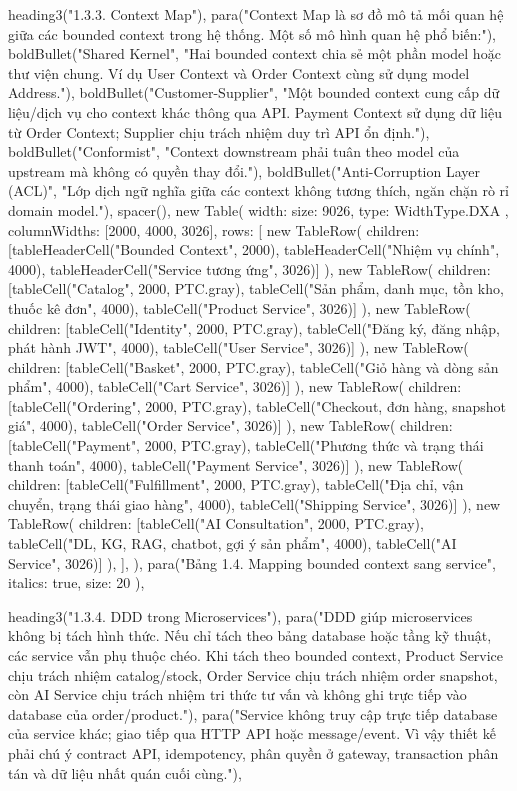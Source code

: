   heading3("1.3.3. Context Map"),
  para("Context Map là sơ đồ mô tả mối quan hệ giữa các bounded context trong hệ thống. Một số mô hình quan hệ phổ biến:"),
  boldBullet("Shared Kernel", "Hai bounded context chia sẻ một phần model hoặc thư viện chung. Ví dụ User Context và Order Context cùng sử dụng model Address."),
  boldBullet("Customer-Supplier", "Một bounded context cung cấp dữ liệu/dịch vụ cho context khác thông qua API. Payment Context sử dụng dữ liệu từ Order Context; Supplier chịu trách nhiệm duy trì API ổn định."),
  boldBullet("Conformist", "Context downstream phải tuân theo model của upstream mà không có quyền thay đổi."),
  boldBullet("Anti-Corruption Layer (ACL)", "Lớp dịch ngữ nghĩa giữa các context không tương thích, ngăn chặn rò rỉ domain model."),
  spacer(),
  new Table({
    width: { size: 9026, type: WidthType.DXA },
    columnWidths: [2000, 4000, 3026],
    rows: [
      new TableRow({ children: [tableHeaderCell("Bounded Context", 2000), tableHeaderCell("Nhiệm vụ chính", 4000), tableHeaderCell("Service tương ứng", 3026)] }),
      new TableRow({ children: [tableCell("Catalog", 2000, PTC.gray), tableCell("Sản phẩm, danh mục, tồn kho, thuốc kê đơn", 4000), tableCell("Product Service", 3026)] }),
      new TableRow({ children: [tableCell("Identity", 2000, PTC.gray), tableCell("Đăng ký, đăng nhập, phát hành JWT", 4000), tableCell("User Service", 3026)] }),
      new TableRow({ children: [tableCell("Basket", 2000, PTC.gray), tableCell("Giỏ hàng và dòng sản phẩm", 4000), tableCell("Cart Service", 3026)] }),
      new TableRow({ children: [tableCell("Ordering", 2000, PTC.gray), tableCell("Checkout, đơn hàng, snapshot giá", 4000), tableCell("Order Service", 3026)] }),
      new TableRow({ children: [tableCell("Payment", 2000, PTC.gray), tableCell("Phương thức và trạng thái thanh toán", 4000), tableCell("Payment Service", 3026)] }),
      new TableRow({ children: [tableCell("Fulfillment", 2000, PTC.gray), tableCell("Địa chỉ, vận chuyển, trạng thái giao hàng", 4000), tableCell("Shipping Service", 3026)] }),
      new TableRow({ children: [tableCell("AI Consultation", 2000, PTC.gray), tableCell("DL, KG, RAG, chatbot, gợi ý sản phẩm", 4000), tableCell("AI Service", 3026)] }),
    ],
  }),
  para("Bảng 1.4. Mapping bounded context sang service", { italics: true, size: 20 }),

  heading3("1.3.4. DDD trong Microservices"),
  para("DDD giúp microservices không bị tách hình thức. Nếu chỉ tách theo bảng database hoặc tầng kỹ thuật, các service vẫn phụ thuộc chéo. Khi tách theo bounded context, Product Service chịu trách nhiệm catalog/stock, Order Service chịu trách nhiệm order snapshot, còn AI Service chịu trách nhiệm tri thức tư vấn và không ghi trực tiếp vào database của order/product."),
  para("Service không truy cập trực tiếp database của service khác; giao tiếp qua HTTP API hoặc message/event. Vì vậy thiết kế phải chú ý contract API, idempotency, phân quyền ở gateway, transaction phân tán và dữ liệu nhất quán cuối cùng."),

